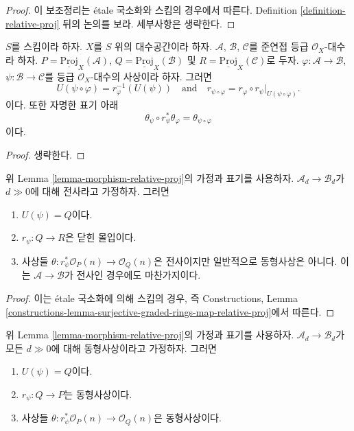\begin{proof}
이 보조정리는 \'etale 국소화와 스킴의 경우에서 따른다. Definition
\ref{definition-relative-proj} 뒤의 논의를 보라. 세부사항은 생략한다.
\end{proof}

\begin{lemma}
\label{lemma-morphism-relative-proj-transitive}
$S$를 스킴이라 하자. $X$를 $S$ 위의 대수공간이라 하자.
$\mathcal{A}$, $\mathcal{B}$, $\mathcal{C}$를 준연접 등급
$\mathcal{O}_X$-대수라 하자.
$P = \underline{\text{Proj}}_X(\mathcal{A})$,
$Q = \underline{\text{Proj}}_X(\mathcal{B})$ 및
$R = \underline{\text{Proj}}_X(\mathcal{C})$로 두자.
$\varphi : \mathcal{A} \to \mathcal{B}$,
$\psi : \mathcal{B} \to \mathcal{C}$를 등급
$\mathcal{O}_X$-대수의 사상이라 하자. 그러면
$$
U(\psi \circ \varphi) = r_\varphi^{-1}(U(\psi))
\quad
\text{and}
\quad
r_{\psi \circ \varphi}
=
r_\varphi \circ r_\psi|_{U(\psi \circ \varphi)}.
$$
이다. 또한 자명한 표기 아래
$$
\theta_\psi \circ r_\psi^*\theta_\varphi
=
\theta_{\psi \circ \varphi}
$$
이다.
\end{lemma}

\begin{proof}
생략한다.
\end{proof}

\begin{lemma}
\label{lemma-surjective-graded-rings-map-relative-proj}
위 Lemma \ref{lemma-morphism-relative-proj}의 가정과 표기를 사용하자.
$\mathcal{A}_d \to \mathcal{B}_d$가 $d \gg 0$에 대해 전사라고 가정하자.
그러면
\begin{enumerate}
\item $U(\psi) = Q$이다.
\item $r_\psi : Q \to R$은 닫힌 몰입이다.
\item 사상들 $\theta : r_\psi^*\mathcal{O}_P(n) \to \mathcal{O}_Q(n)$은
전사이지만 일반적으로 동형사상은 아니다. 이는
$\mathcal{A} \to \mathcal{B}$가 전사인 경우에도 마찬가지이다.
\end{enumerate}
\end{lemma}

\begin{proof}
이는 \'etale 국소화에 의해 스킴의 경우, 즉 Constructions, Lemma
\ref{constructions-lemma-surjective-graded-rings-map-relative-proj}에서
따른다.
\end{proof}

\begin{lemma}
\label{lemma-eventual-iso-graded-rings-map-relative-proj}
위 Lemma \ref{lemma-morphism-relative-proj}의 가정과 표기를 사용하자.
$\mathcal{A}_d \to \mathcal{B}_d$가 모든 $d \gg 0$에 대해
동형사상이라고 가정하자. 그러면
\begin{enumerate}
\item $U(\psi) = Q$이다.
\item $r_\psi : Q \to P$는 동형사상이다.
\item 사상들 $\theta : r_\psi^*\mathcal{O}_P(n) \to \mathcal{O}_Q(n)$은
동형사상이다.
\end{enumerate}
\end{lemma}

